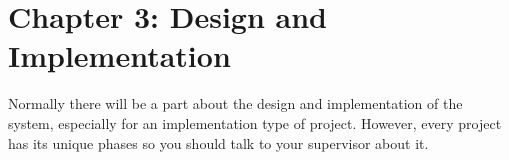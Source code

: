 \section*{Chapter 3: Design and Implementation}
\setcounter{section}{3} \setcounter{subsection}{0}

Normally there will be a part about the design and implementation of the system, especially for an implementation type of project. However, every project has its unique phases so you should talk to your supervisor about it.
